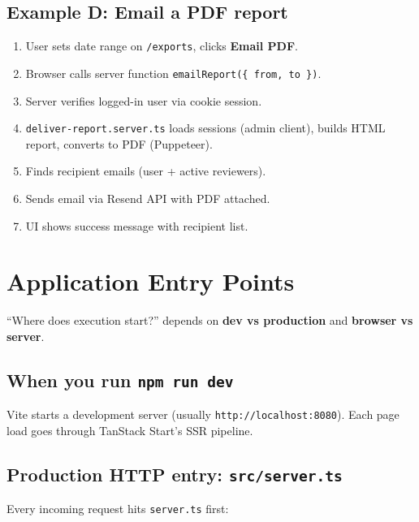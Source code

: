 \documentclass[11pt,a4paper]{article}
\newcommand{\filepath}[1]{\texttt{#1}}
\begin{document}
\subsection{Example D: Email a PDF report}

\begin{enumerate}[leftmargin=*]
  \item User sets date range on \filepath{/exports}, clicks \textbf{Email PDF}.
  \item Browser calls server function \texttt{emailReport(\{ from, to \})}.
  \item Server verifies logged-in user via cookie session.
  \item \filepath{deliver-report.server.ts} loads sessions (admin client), builds HTML report, converts to PDF (Puppeteer).
  \item Finds recipient emails (user + active reviewers).
  \item Sends email via Resend API with PDF attached.
  \item UI shows success message with recipient list.
\end{enumerate}

\section{Application Entry Points}

``Where does execution start?'' depends on \textbf{dev vs production} and \textbf{browser vs server}.

\subsection{When you run \texttt{npm run dev}}

Vite starts a development server (usually \filepath{http://localhost:8080}). Each page load goes through TanStack Start's SSR pipeline.

\subsection{Production HTTP entry: \filepath{src/server.ts}}

Every incoming request hits \filepath{server.ts} first:
\end{document}
